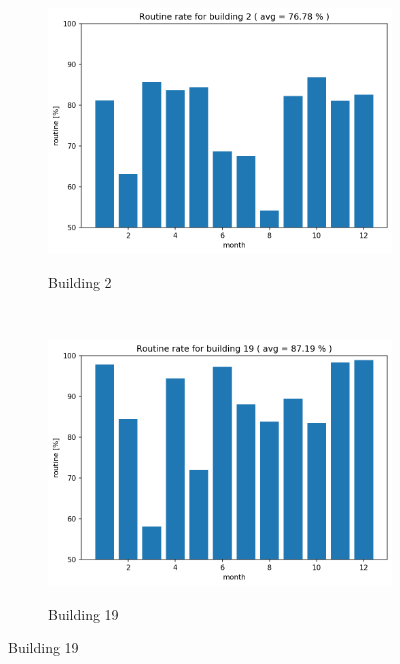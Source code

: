 \begin{figure}[H]
	\begin{subfigure}{.5\textwidth}
		\caption{Building 2}
		\includegraphics[width=1\linewidth]{../Figures/EC/b2year.png}
		\label{fig:ec_b2year}
	\end{subfigure}%
	~ 
	\begin{subfigure}{.5\textwidth}
		\caption{Building 19}
		\includegraphics[width=1\linewidth]{../Figures/EC/b19year.png}
		\label{fig:ec_b19year}
	\end{subfigure}%
    \bigskip


\end{figure}
